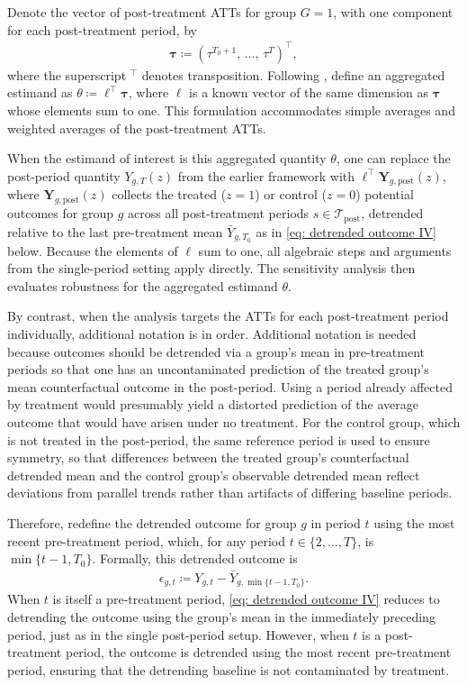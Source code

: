 \documentclass[twoside,11pt]{article}
\begin{document}
Denote the vector of post-treatment \textrm{ATT}s for group $G = 1$, with one component for each post-treatment period, by
\begin{align}
\bm{\tau} \coloneqq \left( \tau^{T_0 + 1},\, \ldots,\, \tau^{T} \right)^{\top},
\end{align}
where the superscript $^{\top}$ denotes transposition. Following \citet[][p.~2561]{rambachanroth2023}, define an aggregated estimand as $\theta \coloneqq \bm{\ell}^{\top}\bm{\tau}$, where $\bm{\ell}$ is a known vector of the same dimension as $\bm{\tau}$ whose elements sum to one. This formulation accommodates simple averages and weighted averages of the post-treatment \textrm{ATT}s.

When the estimand of interest is this aggregated quantity $\theta$, one can
replace the post-period quantity $Y_{g,T}(z)$ from the earlier framework with $\bm{\ell}^{\top}\bm{Y}_{g,\mathrm{post}}(z)$, where $\bm{Y}_{g,\mathrm{post}}(z)$ collects the treated ($z = 1$) or control ($z = 0$) potential outcomes for group $g$ across all
post-treatment periods $s \in \mathcal{T}_{\mathrm{post}}$, detrended relative to the last pre-treatment mean $\bar{Y}_{g,T_0}$ as in \eqref{eq: detrended outcome IV} below. Because the elements of $\bm{\ell}$ sum to one, all algebraic steps and arguments from the single-period setting apply directly. The sensitivity analysis then evaluates robustness for the aggregated estimand $\theta$.

By contrast, when the analysis targets the \textrm{ATT}s for each post-treatment period individually, additional notation is in order. Additional notation is needed because outcomes should be detrended via a group's mean in pre-treatment periods so that one has an uncontaminated prediction of the treated group's mean counterfactual outcome in the post-period. Using a period already affected by treatment would presumably yield a distorted prediction of the average outcome that would have arisen under no treatment. For the control group, which is not treated in the post-period, the same reference period is used to ensure symmetry, so that differences between the treated group's counterfactual detrended mean and the control group's observable detrended mean reflect deviations from parallel trends rather than artifacts of differing baseline periods.

Therefore, redefine the detrended outcome for group $g$ in period $t$ using the most recent pre-treatment period, which, for any period $t \in \{2,\ldots,T\}$, is $\min\{t - 1, T_0\}$. Formally, this detrended outcome is
\begin{align} \label{eq: detrended outcome IV}
\epsilon_{g,t} \coloneqq Y_{g,t} - \bar{Y}_{g,\min\{t - 1, T_0\}}.
\end{align}
When $t$ is itself a pre-treatment period, \eqref{eq: detrended outcome IV} reduces to detrending the outcome using the group's mean in the immediately preceding period, just as in the single post-period setup. However, when $t$ is a post-treatment period, the outcome is detrended using the most recent pre-treatment period, ensuring that the detrending baseline is not contaminated by treatment.
\end{document}
